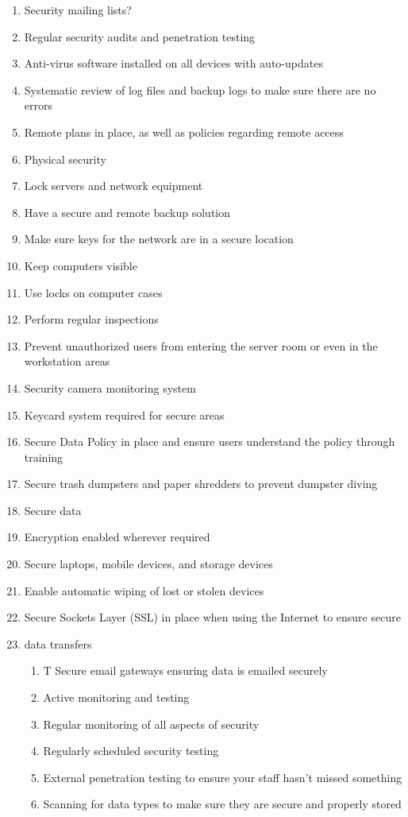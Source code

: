 {\begin{enumerate}
\item Security mailing lists?
\item Regular security audits and penetration testing
\item Anti-virus software installed on all devices with auto-updates
\item Systematic review of log files and backup logs to make sure there are no errors
\item Remote plans in place, as well as policies regarding remote access
\item Physical security
\item Lock servers and network equipment
\item Have a secure and remote backup solution
\item Make sure keys for the network are in a secure location
\item Keep computers visible
\item Use locks on computer cases
\item Perform regular inspections
\item Prevent unauthorized users from entering the server room or even in the workstation areas
\item Security camera monitoring system
\item Keycard system required for secure areas
\item Secure Data Policy in place and ensure users understand the policy through training
\item Secure trash dumpsters and paper shredders to prevent dumpster diving
\item Secure data
\item Encryption enabled wherever required
\item Secure laptops, mobile devices, and storage devices
\item Enable automatic wiping of lost or stolen devices
\item Secure Sockets Layer (SSL) in place when using the Internet to ensure secure

\item data transfers
 

\begin{enumerate}
	\item T Secure email gateways ensuring data is emailed securely
	\item  Active monitoring and testing
	\item Regular monitoring of all aspects of security
	\item Regularly scheduled security testing
	\item  External penetration testing to ensure your staff hasn’t missed something
	\item Scanning for data types to make sure they are secure and properly stored
\end{enumerate}
\end{enumerate}





}
